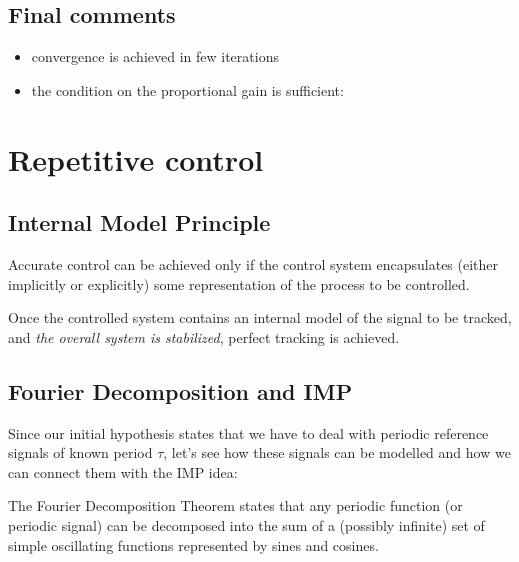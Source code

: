 \documentclass{book}
\begin{document}
\subsection{Final comments}
\begin{itemize}
    \item convergence is achieved in few iterations 
        \item  the condition on the proportional gain is sufficient: 
\end{itemize}


\section{Repetitive control}
\subsection{Internal Model Principle}
Accurate control can be achieved only if the control system encapsulates (either implicitly or explicitly) some representation of the process to be controlled. 

Once the controlled system contains an internal model of the signal to be tracked, and \emph{the overall system is stabilized}, perfect tracking is achieved. 
\subsection{Fourier Decomposition and IMP}
Since our initial hypothesis states that we have to deal with periodic reference signals of known period $\tau$, let's see how these signals can be modelled and how we can connect them with the IMP idea: 

The Fourier Decomposition Theorem states that any periodic function (or periodic signal) can be decomposed into the sum of a (possibly infinite) set of simple oscillating functions represented by sines and cosines. 
\end{document}
